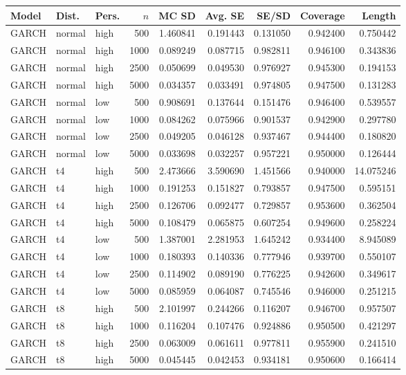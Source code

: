 \begin{tabular}{lllrrrrrr}
\toprule
Model & Dist. & Pers. & $n$ & MC SD & Avg. SE & SE/SD & Coverage & Length \\
\midrule
GARCH & normal & high & 500 & 1.460841 & 0.191443 & 0.131050 & 0.942400 & 0.750442 \\
GARCH & normal & high & 1000 & 0.089249 & 0.087715 & 0.982811 & 0.946100 & 0.343836 \\
GARCH & normal & high & 2500 & 0.050699 & 0.049530 & 0.976927 & 0.945300 & 0.194153 \\
GARCH & normal & high & 5000 & 0.034357 & 0.033491 & 0.974805 & 0.947500 & 0.131283 \\
GARCH & normal & low & 500 & 0.908691 & 0.137644 & 0.151476 & 0.946400 & 0.539557 \\
GARCH & normal & low & 1000 & 0.084262 & 0.075966 & 0.901537 & 0.942900 & 0.297780 \\
GARCH & normal & low & 2500 & 0.049205 & 0.046128 & 0.937467 & 0.944400 & 0.180820 \\
GARCH & normal & low & 5000 & 0.033698 & 0.032257 & 0.957221 & 0.950000 & 0.126444 \\
GARCH & t4 & high & 500 & 2.473666 & 3.590690 & 1.451566 & 0.940000 & 14.075246 \\
GARCH & t4 & high & 1000 & 0.191253 & 0.151827 & 0.793857 & 0.947500 & 0.595151 \\
GARCH & t4 & high & 2500 & 0.126706 & 0.092477 & 0.729857 & 0.953600 & 0.362504 \\
GARCH & t4 & high & 5000 & 0.108479 & 0.065875 & 0.607254 & 0.949600 & 0.258224 \\
GARCH & t4 & low & 500 & 1.387001 & 2.281953 & 1.645242 & 0.934400 & 8.945089 \\
GARCH & t4 & low & 1000 & 0.180393 & 0.140336 & 0.777946 & 0.939700 & 0.550107 \\
GARCH & t4 & low & 2500 & 0.114902 & 0.089190 & 0.776225 & 0.942600 & 0.349617 \\
GARCH & t4 & low & 5000 & 0.085959 & 0.064087 & 0.745546 & 0.946000 & 0.251215 \\
GARCH & t8 & high & 500 & 2.101997 & 0.244266 & 0.116207 & 0.946700 & 0.957507 \\
GARCH & t8 & high & 1000 & 0.116204 & 0.107476 & 0.924886 & 0.950500 & 0.421297 \\
GARCH & t8 & high & 2500 & 0.063009 & 0.061611 & 0.977811 & 0.955900 & 0.241510 \\
GARCH & t8 & high & 5000 & 0.045445 & 0.042453 & 0.934181 & 0.950600 & 0.166414 \\

\end{tabular}
